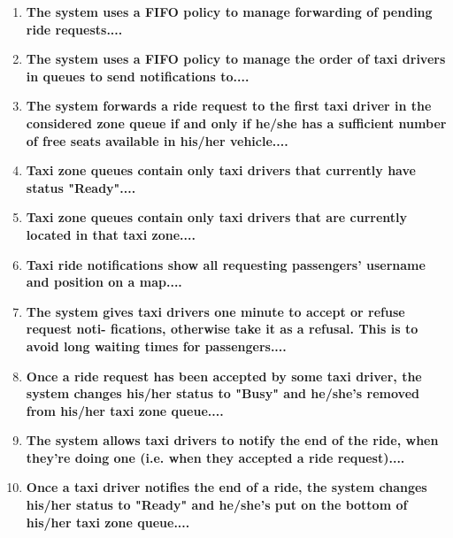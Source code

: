 \begin{enumerate}
	\item \textbf{The system uses a FIFO policy to manage forwarding of pending ride
		requests....}\\
	
	\item \textbf{The system uses a FIFO policy to manage the order of taxi drivers in
		queues to send notifications to....}\\
	
	\item \textbf{The system forwards a ride request to the first taxi driver in the considered
		zone queue if and only if he/she has a sufficient number of free seats
		available in his/her vehicle....}\\
	
	\item \textbf{Taxi zone queues contain only taxi drivers that currently have status
		"Ready"....}\\
	
	\item \textbf{Taxi zone queues contain only taxi drivers that are currently located in
		that taxi zone....}\\
	
	\item \textbf{Taxi ride notifications show all requesting passengers' username and position on a map....}\\
	
	\item \textbf{The system gives taxi drivers one minute to accept or refuse request noti-
		fications, otherwise take it as a refusal. This is to avoid long waiting times
		for passengers....}\\
	
	\item \textbf{Once a ride request has been accepted by some taxi driver, the system
		changes his/her status to "Busy" and he/she's removed from his/her taxi
		zone queue....}\\
	
	\item \textbf{The system allows taxi drivers to notify the end of the ride, when they're
		doing one (i.e. when they accepted a ride request)....}\\
	
	\item \textbf{Once a taxi driver notifies the end of a ride, the system changes his/her
		status to "Ready" and he/she's put on the bottom of his/her taxi zone
		queue....}\\
	

\end{enumerate}
